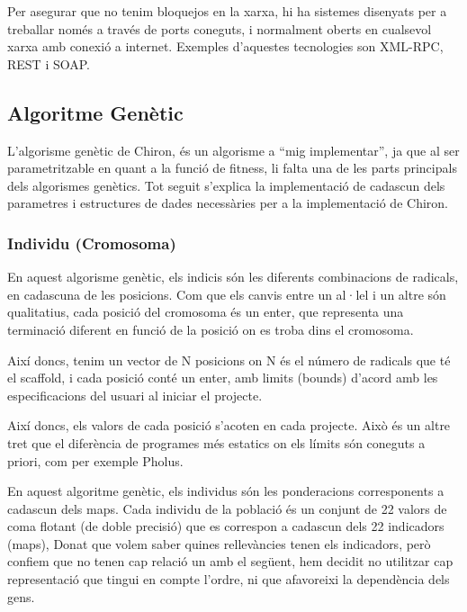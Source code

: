 \documentclass[titlepage,a4paper,12pt]{book}
\begin{document}
Per asegurar que no tenim bloquejos en la xarxa, hi ha sistemes disenyats per a
treballar només a través de ports coneguts, i normalment oberts en cualsevol
xarxa amb conexió a internet.  Exemples d'aquestes tecnologies son XML-RPC, REST
i SOAP.


\subsection{Algoritme Genètic} %
	\label{sub:Algoritme Genetic}

L'algorisme genètic de Chiron, és un algorisme a ``mig implementar'', ja que al
ser parametritzable en quant a la funció de fitness, li falta una de les parts
principals dels algorismes genètics.  Tot seguit s'explica la implementació de
cadascun dels parametres i estructures de dades necessàries per a la
implementació de Chiron.

\subsubsection{Individu (Cromosoma)}
\label{ssub:individu (cromosoma)}

En aquest algorisme genètic, els indicis són les diferents combinacions de
radicals, en cadascuna de les posicions. Com que els canvis entre un al·lel i un
altre són qualitatius, cada posició del cromosoma és un enter, que representa
una terminació diferent en funció de la posició on es troba dins el cromosoma.

Així doncs, tenim un vector de N posicions on N és el número de radicals que té
el scaffold, i cada posició conté un enter, amb limits (bounds) d'acord amb les
especificacions del usuari al iniciar el projecte. 

Així doncs, els valors de cada posició s'acoten en cada projecte.  Això és un
altre tret que el diferència de programes més estatics on els límits són
coneguts a priori, com per exemple Pholus. 


En aquest algoritme genètic, els individus són les ponderacions corresponents a
cadascun dels maps.  Cada individu de la població és un conjunt de 22 valors de
coma flotant (de doble precisió) que es correspon a cadascun dels 22 indicadors
(maps),  Donat que volem saber quines rellevàncies tenen els indicadors, però
confiem que no tenen cap relació un amb el següent, hem decidit no utilitzar cap
representació que tingui en compte l'ordre, ni que afavoreixi la dependència
dels gens. %
\end{document}
